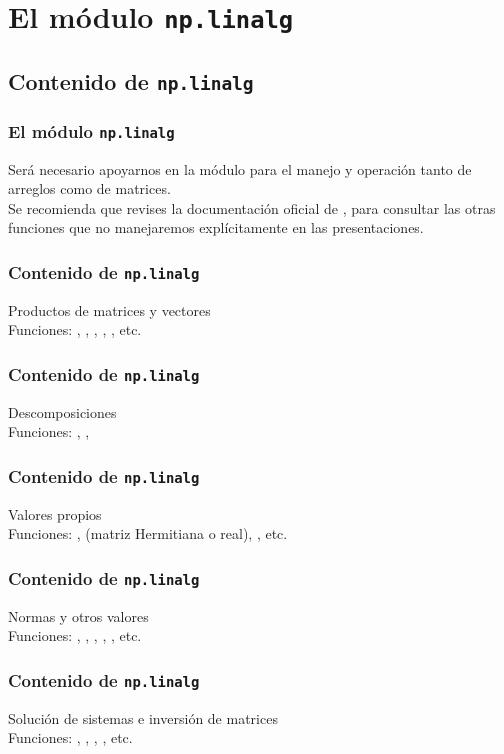 \section{El módulo \texttt{np.linalg}}
\subsection{Contenido de \texttt{np.linalg}}
\begin{frame}
\frametitle{El módulo \texttt{np.linalg}}
Será necesario apoyarnos en la módulo  para el manejo y operación tanto de arreglos como de matrices.
\\
\bigskip
Se recomienda que revises la documentación oficial de \python, para consultar las otras funciones que no manejaremos explícitamente en las presentaciones.
\end{frame}
\begin{frame}
\frametitle{Contenido de \texttt{np.linalg}}
Productos de matrices y vectores
\\
\bigskip
Funciones: , , , , , etc.
\end{frame}
\begin{frame}
\frametitle{Contenido de \texttt{np.linalg}}
Descomposiciones
\\
\bigskip
Funciones: , , 
\end{frame}
\begin{frame}
\frametitle{Contenido de \texttt{np.linalg}}
Valores propios
\\
\bigskip
Funciones: ,  (matriz Hermitiana o real), , etc.
\end{frame}
\begin{frame}
\frametitle{Contenido de \texttt{np.linalg}}
Normas y otros valores
\\
\bigskip
Funciones: , , , , , etc.
\end{frame}
\begin{frame}
\frametitle{Contenido de \texttt{np.linalg}}
Solución de sistemas e inversión de matrices
\\
\bigskip
Funciones:  , , , , etc.   
\end{frame}
